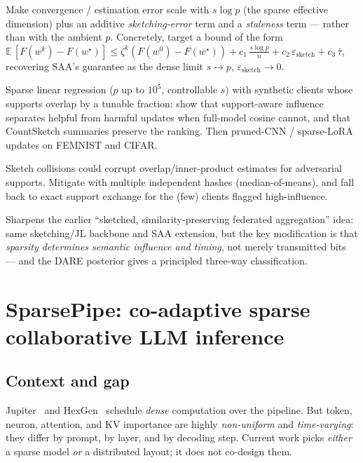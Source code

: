 \documentclass[11pt]{article}
\begin{document}
\begin{theorybox}
Make convergence / estimation error scale with $s\log p$ (the sparse effective dimension)
plus an additive \emph{sketching-error} term and a \emph{staleness} term --- rather than
with the ambient $p$. Concretely, target a bound of the form
$\mathbb{E}\,[F(w^k)-F(w^\star)]\le \zeta^k(F(w^0)-F(w^\star)) + c_1\,\tfrac{s\log p}{n} + c_2\,\varepsilon_{\text{sketch}} + c_3\,\bar\tau$,
recovering SAA's guarantee as the dense limit $s\!\to\!p$, $\varepsilon_{\text{sketch}}\!\to\!0$.
\end{theorybox}

\begin{expbox}
Sparse linear regression ($p$ up to $10^5$, controllable $s$) with synthetic clients whose
supports overlap by a tunable fraction: show that support-aware influence separates helpful
from harmful updates when full-model cosine cannot, and that CountSketch summaries preserve
the ranking. Then pruned-CNN / sparse-LoRA updates on FEMNIST and CIFAR.
\end{expbox}

\begin{riskbox}
Sketch collisions could corrupt overlap/inner-product estimates for adversarial supports.
Mitigate with multiple independent hashes (median-of-means), and fall back to exact
support exchange for the (few) clients flagged high-influence.
\end{riskbox}

\begin{buildbox}
Sharpens the earlier ``sketched, similarity-preserving federated aggregation'' idea:
same sketching/JL backbone and SAA extension, but the key modification is that
\emph{sparsity determines semantic influence and timing}, not merely transmitted bits ---
and the DARE posterior gives a principled three-way classification.
\end{buildbox}

\section{SparsePipe: co-adaptive sparse collaborative LLM inference}
\label{sec:sparsepipe}

\subsection*{Context and gap}
Jupiter~\cite{jupiter} and HexGen~\cite{hexgen} schedule \emph{dense} computation over the
pipeline. But token, neuron, attention, and KV importance are highly \emph{non-uniform} and
\emph{time-varying}: they differ by prompt, by layer, and by decoding step. Current work
picks \emph{either} a sparse model \emph{or} a distributed layout; it does not co-design them.
\end{document}
